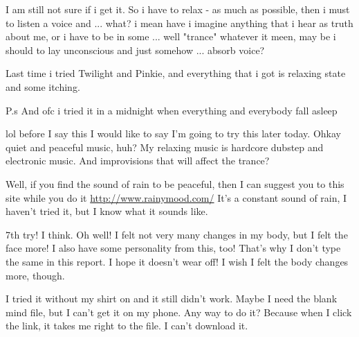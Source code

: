 \documentclass[ebook,12pt,oneside,openany]{memoir}
\begin{document}
\begin{tcolorbox}[title=IceBeerG]
\par{I am still not sure if i get it. So i have to relax - as much as possible, then i must to listen a voice and ... what? i mean have i imagine anything that i hear as truth about me, or i have to be in some ... well "trance" whatever it meen, may be i should to lay unconscious and just somehow ... absorb voice?}
\par{Last time i tried Twilight and Pinkie, and everything that i got is relaxing state and some itching.}
\par{P.s And ofc i tried it in a midnight when everything and everybody fall asleep}
\end{tcolorbox}
\begin{tcolorbox}[title=The Original,colback=green!5!white,colframe=green!75!black,coltitle=white]
\begin{tcolorbox}[title=Theory404]
\par{lol before I say this I would like to say I'm going to try this later today. Ohkay quiet and peaceful music, huh? My relaxing music is hardcore dubstep and electronic music. And improvisions that will affect the trance?}
\end{tcolorbox}
\par{Well, if you find the sound of rain to be peaceful, then I can suggest you to this site while you do it \href{http://www.rainymood.com/}{http://www.rainymood.com/} It's a constant sound of rain, I haven't tried it, but I know what it sounds like.}
\end{tcolorbox}
\begin{tcolorbox}[title=Shining Wing,colback=blue!5!white,colframe=blue!75!black,coltitle=white]
\par{7th try! I think. Oh well! I felt not very many changes in my body, but I felt the face more! I also have some personality from this, too! That's why I don't type the same in this report. I hope it doesn't wear off! I wish I felt the body changes more, though.}
\end{tcolorbox}
\begin{tcolorbox}[title=C. Thunder Dash,colback=orange!5!white,colframe=orange!75!black,coltitle=white]
\par{I tried it without my shirt on and it still didn't work. Maybe I need the blank mind file, but I can't get it on my phone. Any way to do it? Because when I click the link, it takes me right to the file. I can't download it. }
\end{tcolorbox}
\end{document}
